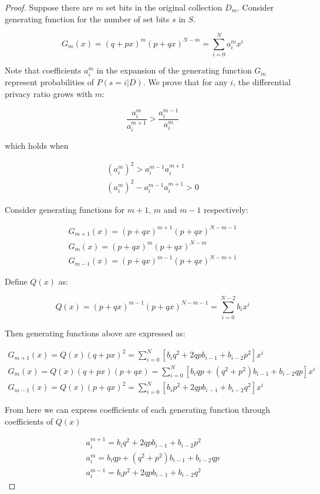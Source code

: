 \documentclass[11pt,draft]{article}
\begin{document}
\begin{proof}

Suppose there are $m$ set bits in the original collection $D_m$.  Consider generating function for the number of set bits $s$ in $S$.

\[
G_m(x) = (q + px)^m (p + qx)^{N-m} = \sum_{i=0}^{N} a_i^mx^i
\]

Note that coefficients $a_i^m$ in the expansion of the generating function $G_m$ represent probabilities of $P(s=i | D)$.  We prove that for any $i$, the differential privacy ratio grows with $m$:

\[
\frac{a_i^m}{a_i^{m+1}} > \frac{a_i^{m-1}}{a_i^{m}}
\] 

which holds when

\begin{align}
(a_i^m)^2 > a_i^{m-1}a_i^{m+1}  \\
(a_i^m)^2  - a_i^{m-1}a_i^{m+1} > 0
\end{align}

Consider generating functions for $m+1$, $m$ and $m-1$ respectively:

\begin{align}
G_{m+1}(x) = (p + qx)^{m+1} (p + qx)^{N-m-1} \\
G_m(x) = (p + qx)^m (p + qx)^{N-m} \\
G_{m-1}(x) = (p + qx)^{m-1} (p + qx)^{N-m+1}
\end{align}

Define $Q(x)$ as:

\[ 
Q(x) = (p + qx)^{m-1} (p + qx)^{N-m-1} = \sum_{i=0}^{N-2} b_i x^i 
\]

Then generating functions above are expressed as:

\begin{align}
G_{m+1}(x) = Q(x) (q+px)^2 =  \sum_{i=0}^{N} [b_iq^2 + 2qp b_{i-1} + b_{i-2} p^2] x^i \\
G_m(x) = Q(x) (q+px)(p + qx) =  \sum_{i=0}^{N} [b_iqp + (q^2 + p^2) b_{i-1} + b_{i-2} qp] x^i \\
G_{m-1}(x) = Q(x) (p+qx)^2 = \sum_{i=0}^{N} [b_ip^2 + 2qp b_{i-1} + b_{i-2} q^2] x^i
\end{align}

From here we can express coefficients of each generating function through coefficients of $Q(x)$

\begin{align}
a_i^{m+1} = b_iq^2 + 2qp b_{i-1} + b_{i-2} p^2\\
a_i^m = b_iqp + (q^2 + p^2) b_{i-1} + b_{i-2} qp \\
a_i^{m-1}= b_ip^2 + 2qp b_{i-1} + b_{i-2} q^2
\end{align}


\end{proof}
\end{document}
